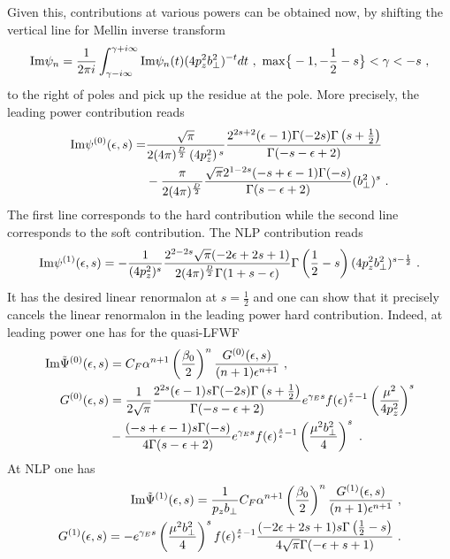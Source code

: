 \documentclass[a4paper,11pt]{article}
\begin{document}
Given this, contributions at various powers can be obtained now, by shifting the vertical line for Mellin inverse transform 
\begin{align}
{\rm Im}\psi_n=\frac{1}{2\pi i}\int_{\gamma-i\infty}^{\gamma+i\infty}{\rm Im}\psi_n(t)(4p_z^2b_\perp^2)^{-t}dt \ ,  \ {\rm max}\big\{-1,-\frac{1}{2}-s \big\}<\gamma<-s  \ ,
\end{align}
to the right of poles and pick up the residue at the pole. More precisely, the leading power contribution reads
\begin{align}
{\rm Im }\psi^{(0)}(\epsilon,s)=&\frac{\sqrt{\pi}}{2(4\pi)^{\frac{D}{2}}\left(4 p_z^2\right){}^{s}}\frac{ 2^{2s+2}(\epsilon -1) \Gamma (-2 s) \Gamma \left(s+\frac{1}{2}\right)}{\Gamma (-s-\epsilon +2)}\nonumber \\ 
&-\frac{\pi}{2(4\pi)^{\frac{D}{2}}} \frac{\sqrt{\pi } 2^{1-2 s} (-s+\epsilon -1) \Gamma (-s)}{\Gamma (s-\epsilon +2)}(b_\perp^2)^{s} \ .
\end{align}
The first line corresponds to the hard contribution while the second line corresponds to the soft contribution. The NLP contribution reads
\begin{align}\label{eq:WFf1}
{\rm Im} \psi^{(1)}(\epsilon,s)=-\frac{1}{(4p_z^2)^s}\frac{2^{2-2s}\sqrt{\pi}(-2\epsilon+2s+1)}{2(4\pi)^{\frac{D}{2}} \Gamma (1+s-\epsilon)}\Gamma\left(\frac{1}{2}-s\right)(4p_z^2b_\perp^2)^{s-\frac{1}{2}} \ .
\end{align}
It has the desired linear renormalon at $s=\frac{1}{2}$ and one can show that it precisely cancels the linear renormalon in the leading power hard contribution. Indeed, at leading power one has for the quasi-LFWF
\begin{align}
{\rm Im} \tilde \Psi^{(0)}(\epsilon,s)&=C_F\alpha^{n+1}\left(\frac{\beta_0}{2}\right)^n\frac{G^{(0)}(\epsilon,s)}{(n+1)\epsilon^{n+1}} \ , \\ 
 G^{(0)}(\epsilon,s)&=\frac{1}{2\sqrt{\pi}}\frac{ 2^{2s}(\epsilon -1) s\Gamma (-2 s) \Gamma \left(s+\frac{1}{2}\right)}{\Gamma (-s-\epsilon +2)}e^{\gamma_Es}f(\epsilon)^{\frac{s}{\epsilon}-1}\left(\frac{\mu^2}{4p_z^2}\right)^s \nonumber \\
&-\frac{(-s+\epsilon -1) s\Gamma (-s)}{4\Gamma (s-\epsilon +2)}e^{\gamma_Es}f(\epsilon)^{\frac{s}{\epsilon}-1}\left(\frac{\mu^2b_\perp^2}{4}\right)^{s} \ .
\end{align}
At NLP one has
\begin{align}
{\rm Im} \tilde \Psi^{(1)}(\epsilon,s)=\frac{1}{p_zb_\perp}C_F\alpha^{n+1}\left(\frac{\beta_0}{2}\right)^n\frac{G^{(1)}(\epsilon,s)} {(n+1)\epsilon^{n+1}} \ , \\ 
G^{(1)}(\epsilon,s)=-e^{\gamma_Es}\left(\frac{\mu^2b_\perp^2}{4}\right)^s f(\epsilon)^{\frac{s}{\epsilon}-1}\frac{(-2\epsilon+2 s+1)s \Gamma \left(\frac{1}{2}-s\right) }{4 \sqrt{\pi } \Gamma (-\epsilon+s+1)} \ .
\end{align}
\end{document}

